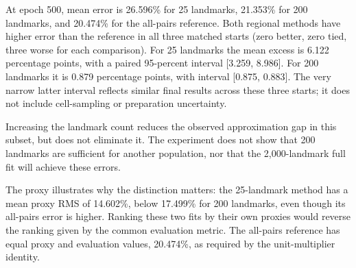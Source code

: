 At epoch 500, mean error is 26.596\% for 25 landmarks, 21.353\% for 200 landmarks, and 20.474\% for the all-pairs reference. Both regional methods have higher error than the reference in all three matched starts (zero better, zero tied, three worse for each comparison). For 25 landmarks the mean excess is 6.122 percentage points, with a paired 95-percent interval [3.259, 8.986]. For 200 landmarks it is 0.879 percentage points, with interval [0.875, 0.883]. The very narrow latter interval reflects similar final results across these three starts; it does not include cell-sampling or preparation uncertainty.

Increasing the landmark count reduces the observed approximation gap in this subset, but does not eliminate it. The experiment does not show that 200 landmarks are sufficient for another population, nor that the 2,000-landmark full fit will achieve these errors.


The proxy illustrates why the distinction matters: the 25-landmark method has a mean proxy RMS of 14.602\%, below 17.499\% for 200 landmarks, even though its all-pairs error is higher. Ranking these two fits by their own proxies would reverse the ranking given by the common evaluation metric. The all-pairs reference has equal proxy and evaluation values, 20.474\%, as required by the unit-multiplier identity.
